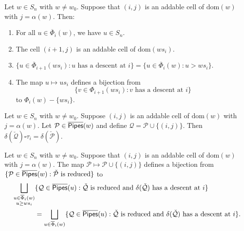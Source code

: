 \documentclass[10pt,a4paper]{amsart}
\newcommand{\addable}{\alpha}
\newcommand{\cotransitionperms}{\Phi}
\newcommand{\demprod}{\delta}
\newcommand{\dom}{\mathrm{dom}}
\newcommand{\kcotransitionperms}{\overline{\Phi}}
\newcommand{\kpipes}{\overline{\sf Pipes}}
\begin{document}
		\begin{lemma}
			\label{lemma:whathappenswithwsianddescents}
			Let $w \in S_n$ with $w \neq w_0$. Suppose that $(i,j)$ is an addable cell of $\dom(w)$ with $j = \addable(w)$. Then:
			\begin{enumerate}
				\item For all $u \in \kcotransitionperms_i(w)$, we have $u \in S_n$.
				\item The cell $(i + 1,j)$ is an addable cell of $\dom(ws_i)$. 
				\item $\{u \in \kcotransitionperms_{i + 1}(ws_i) : u \text{ has a descent at } i\} = \{u \in \kcotransitionperms_{i}(w): u > ws_i\}.$
				\item The map $u \mapsto us_i$ defines a bijection from 
				\[\{v \in \cotransitionperms_{i + 1}(ws_i) : v \text{ has a descent at } i\}\]
				to $\cotransitionperms_{i}(w)-\{ws_i\}$.
			\end{enumerate} 
		\end{lemma}

		\begin{lemma}
			\label{lemma:cotransitionflippermutation}
			Let $w \in S_n$ with $w \neq w_0$. 
			Suppose $(i,j)$ is an addable cell of $\dom(w)$ with $j = \addable(w)$. 
			Let $\mathcal{P} \in \kpipes(w)$ and define $\mathcal{Q} = \mathcal{P} \cup \{(i,j)\}$.
			Then $\demprod(\check{\mathcal{Q}})\square \tau_i = \demprod(\check{\mathcal{P}})$.
		\end{lemma}

		\begin{lemma}
			\label{lemma:kcotransitionrestrictedbijection}
			Let $w \in S_n$ with $w \neq w_0$. 
			Suppose that $(i,j)$ is an addable cell of $\dom(w)$ with $j = \addable(w)$.
			The map $\mathcal{P} \mapsto \mathcal{P} \cup \{(i,j)\}$ defines a bijection from $\{\mathcal{P} \in \kpipes(w) : \check{\mathcal{P}} \text{ is reduced}\}$ to 
			\begin{align}
				\label{eq:bigunionintwoforms}
				\bigsqcup_{\substack{u \in \kcotransitionperms_i(w)\\u\geq ws_i}} &\{\mathcal{Q} \in \kpipes(u):\check {\mathcal{Q}} \text{ is reduced and } \demprod(\check{\mathcal{Q}}) \text{ has a descent at } i\}\\
				& = \bigsqcup_{u \in \kcotransitionperms_i(w)} \{\mathcal{Q} \in \kpipes(u):\check {\mathcal{Q}} \text{ is reduced and } \demprod(\check{\mathcal{Q}}) \text{ has a descent at } i\}. \nonumber
			\end{align}
		\end{lemma}
\end{document}
